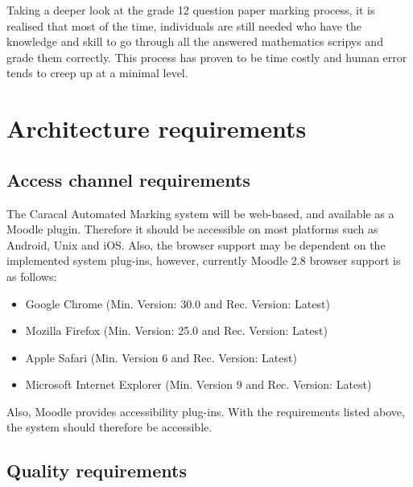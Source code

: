 \documentclass{article}
\begin{document}
Taking a deeper look at the grade 12 question paper marking process, it is realised that most of the time, individuals are still needed who have the knowledge and skill to go through all the answered mathematics scripys and grade them correctly. This process has proven to be time costly and human error tends to creep up at a minimal level.

\section{Architecture requirements}

	\subsection{Access channel requirements}
	
The Caracal Automated Marking system will be web-based, and available as a Moodle plugin. Therefore it should be accessible on most platforms such as Android, Unix and iOS. Also, the browser support may be dependent on the implemented system plug-ins, however, currently Moodle 2.8 browser support is as follows:
	\begin{itemize}
		\item Google Chrome (Min. Version: 30.0 and Rec. Version: Latest)
		\item Mozilla Firefox (Min. Version: 25.0 and Rec. Version: Latest)
		\item Apple Safari (Min. Version 6 and Rec. Version: Latest)
		\item Microsoft Internet Explorer (Min. Version 9 and Rec. Version: Latest)
	\end{itemize}
Also, Moodle provides accessibility plug-ins. With the requirements listed above, the system should therefore be accessible.
	\subsection{Quality requirements}	
\end{document}
